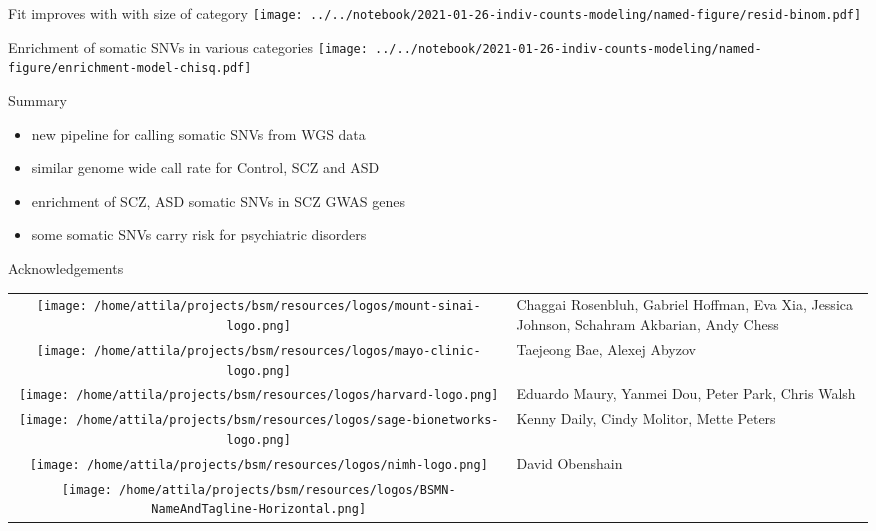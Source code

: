 \documentclass[usenames,dvipsnames]{beamer}
\begin{document}
\begin{frame}{Fit improves with with size of category}
\texttt{[image: ../../notebook/2021-01-26-indiv-counts-modeling/named-figure/resid-binom.pdf]}
\end{frame}

\begin{frame}{Enrichment of somatic SNVs in various categories}
\texttt{[image: ../../notebook/2021-01-26-indiv-counts-modeling/named-figure/enrichment-model-chisq.pdf]}
\end{frame}

\begin{frame}{Summary}
\begin{itemize}
\item new pipeline for calling somatic SNVs from WGS data
\item similar genome wide call rate for Control, SCZ and ASD
\item enrichment of SCZ, ASD somatic SNVs in SCZ GWAS genes
\item some somatic SNVs carry risk for psychiatric disorders
\end{itemize}
\end{frame}

\begin{frame}{Acknowledgements}
\footnotesize
\begin{tabular}{cp{3in}}
\parbox[c]{9em}{\texttt{[image: /home/attila/projects/bsm/resources/logos/mount-sinai-logo.png]}}
& Chaggai Rosenbluh, Gabriel Hoffman, Eva Xia, Jessica Johnson, Schahram Akbarian, Andy Chess \\
\noalign{\medskip}
\parbox[c]{9em}{\texttt{[image: /home/attila/projects/bsm/resources/logos/mayo-clinic-logo.png]}} & Taejeong Bae, Alexej Abyzov \\
\noalign{\medskip}
\parbox[c]{9em}{\texttt{[image: /home/attila/projects/bsm/resources/logos/harvard-logo.png]}}
& Eduardo Maury, Yanmei Dou, Peter Park, Chris Walsh \\
\noalign{\medskip}
\parbox[c]{9em}{\texttt{[image: /home/attila/projects/bsm/resources/logos/sage-bionetworks-logo.png]}} & Kenny Daily, Cindy Molitor, Mette Peters \\
\noalign{\medskip}
\parbox[c]{9em}{\texttt{[image: /home/attila/projects/bsm/resources/logos/nimh-logo.png]}}
& David Obenshain \\
\noalign{\medskip}
\parbox[c]{9em}{\texttt{[image: /home/attila/projects/bsm/resources/logos/BSMN-NameAndTagline-Horizontal.png]}}
& \\
\end{tabular}
\end{frame}
\end{document}
